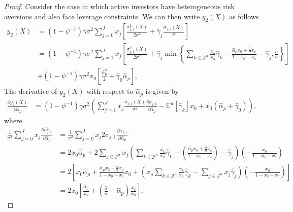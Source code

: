 \begin{proof}
	Consider the case in which active investors have heterogeneous risk aversions and also face leverage constraints. We can then write $y_2(X)$ as follows
	\begin{align}
	y_2(X) &=  \left(1-\psi^{-1}\right) \gamma \sigma^2 \sum_{j=0}^J x_{j} \left[ \frac{\sigma_{j,1}^2(X)}{2 \sigma^2} + \hat{\gamma}_j \frac{\sigma_{j,1}(X)}{\sigma}  \right] \nonumber\\
	&=\left(1-\psi^{-1}\right) \gamma \sigma^2 \sum_{j=1}^J x_{j} \left[\frac{\sigma_{j,1}^2(X)}{2 \sigma^2}+ \hat{\gamma}_j \min\left\{ \sum_{k\in\mathcal{J}^u} \frac{x_k}{x_u} \hat{\gamma}_k -\frac{\hat{\alpha}_p  x_0+\frac{\hat{\sigma}}{\sigma} x_c }{1-x_0-x_c}- \hat{\gamma}_j  ,\frac{\hat{\sigma}}{\sigma}  \right\}  \right] \nonumber \\
	&+\left(1-\psi^{-1}\right) \gamma \sigma^2 x_0 \left[ \frac{\hat{\alpha}_p^2}{2} + \hat{\gamma}_0 \hat{\alpha}_p \right],
	\end{align}
	The derivative of $y_2(X)$ with respect to $\hat{\alpha}_p$ is given by 
	\begin{align}
	\frac{\partial y_2(X)}{\partial \hat{\alpha}_p}   &=\left(1-\psi^{-1}\right) \gamma \sigma^2 \left(\sum_{j=1}^J x_{j} \frac{\sigma_{j,1}(X)}{ \sigma^2} \frac{\partial \sigma_{j,1}}{\partial \hat{\alpha}_p}-\mathbb{E}^u[\hat{\gamma}_k] x_0 + x_0 (\hat{\alpha}_p+ \hat{\gamma}_0) \right), \nonumber 
	\end{align}
	where
	\begin{align}
	\frac{1}{\sigma^2}\sum_{j=0}^J x_j \frac{\partial \sigma_{j,1}^2}{\partial \hat{\alpha}_p} &=\frac{1}{\sigma^2} \sum_{j=0}^J x_j2 \sigma_{j,1} \frac{\partial \sigma_{j,1}}{\partial \hat{\alpha}_p} \nonumber\\
	&= 2 x_0  \hat{\alpha}_p  + 2 \sum_{j\in\mathcal{J}^u} x_j \left( \sum_{k\in\mathcal{J}^u} \frac{x_k}{x_u} \hat{\gamma}_k -\left(\frac{\hat{\alpha}_p  x_0+\frac{\hat{\sigma}}{\sigma}x_c}{1-x_0-x_c}\right)- \hat{\gamma}_j\right) \left( -\frac{x_0}{1-x_0-x_c}\right) \nonumber \\
	&= 2 \left[ x_0 \hat{\alpha}_p + \frac{\hat{\alpha}_p x_0+\frac{\hat{\sigma}}{\sigma}x_c}{1-x_0-x_c}x_0+ \left(x_u \sum_{k\in\mathcal{J}^u} \frac{x_k}{x_u} \hat{\gamma}_k - \sum_{j\in\mathcal{J}^u} x_j\hat{\gamma}_j\right) \left( -\frac{x_0}{1-x_0-x_c}\right)\right] \nonumber \\
	&= 2 x_0 \left[\frac{\hat{\alpha}_p}{x_u} + \left(\frac{\hat{\sigma}}{\sigma} - \hat{\alpha}_p \right)\frac{x_c}{x_u}\right].
	\end{align}
	

\end{proof}
